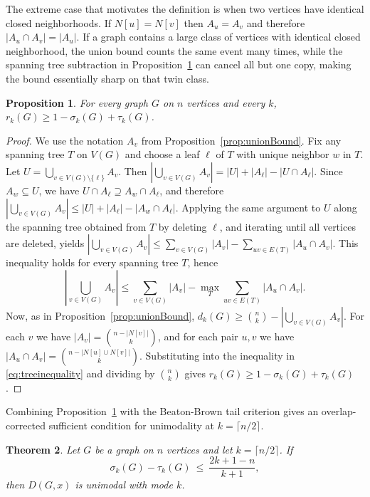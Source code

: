 \documentclass[11pt]{amsart}
\newtheorem{theorem}{Theorem}
\newtheorem{proposition}[theorem]{Proposition}
\numberwithin{equation}{section}
\newcommand{\VV}{V(G)}
\begin{document}
The extreme case that motivates the definition is when two vertices have identical closed neighborhoods. If $N[u]=N[v]$ then $A_u=A_v$ and therefore $|A_u\cap A_v|=|A_u|$. If a graph contains a large class of vertices with identical closed neighborhood, the union bound counts the same event many times, while the spanning tree subtraction in Proposition~\ref{prop:overlapBound} can cancel all but one copy, making the bound essentially sharp on that twin class.

\begin{proposition}\label{prop:overlapBound}
For every graph $G$ on $n$ vertices and every $k$, $r_k(G)\ge1-\sigma_k(G)+\tau_k(G)$.
\end{proposition}

\begin{proof}
We use the notation $A_v$ from Proposition~\ref{prop:unionBound}. Fix any spanning tree $T$ on $\VV$ and choose a leaf $\ell$ of $T$ with unique neighbor $w$ in $T$. Let $U=\bigcup_{v\in \VV\setminus\{\ell\}} A_v$. Then $\left|\bigcup_{v\in\VV}A_v\right|=|U|+|A_\ell|-|U\cap A_\ell|.$ Since $A_w\subseteq U$, we have $U\cap A_\ell\supseteq A_w\cap A_\ell$, and therefore $\left|\bigcup_{v\in\VV}A_v\right|\le |U|+|A_\ell|-|A_w\cap A_\ell|.$ Applying the same argument to $U$ along the spanning tree obtained from $T$ by deleting $\ell$, and iterating until all vertices are deleted, yields $\left|\bigcup_{v\in\VV}A_v\right| \le \sum_{v\in\VV}|A_v|-\sum_{uv\in E(T)}|A_u\cap A_v|.$ This inequality holds for every spanning tree $T$, hence
\begin{equation}\label{eq:treeinequality}
\left|\bigcup_{v\in\VV}A_v\right|
\le \sum_{v\in\VV}|A_v|-\max_T\sum_{uv\in E(T)}|A_u\cap A_v|.
\end{equation}
Now, as in Proposition~\ref{prop:unionBound}, $d_k(G)\ge \binom{n}{k}-\left|\bigcup_{v\in\VV}A_v\right|.$ For each $v$ we have $|A_v|=\binom{n-|N[v]|}{k}$, and for each pair $u,v$ we have $|A_u\cap A_v|=\binom{n-|N[u]\cup N[v]|}{k}$. Substituting into the inequality in \eqref{eq:treeinequality} and dividing by $\binom{n}{k}$ gives $r_k(G)\ge 1-\sigma_k(G)+\tau_k(G)$.
\end{proof}

Combining Proposition~\ref{prop:overlapBound} with the Beaton-Brown tail criterion gives an overlap-corrected sufficient condition for unimodality at $k=\lceil n/2\rceil$.

\begin{theorem}\label{thm:sigmaTauUnimodality}
Let $G$ be a graph on $n$ vertices and let $k=\lceil n/2\rceil$. If
\begin{equation}\label{eq:sigmaTauCriterion}
\sigma_k(G)-\tau_k(G)\ \le\ \frac{2k+1-n}{k+1},
\end{equation}
then $D(G,x)$ is unimodal with mode $k$.
\end{theorem}
\end{document}
